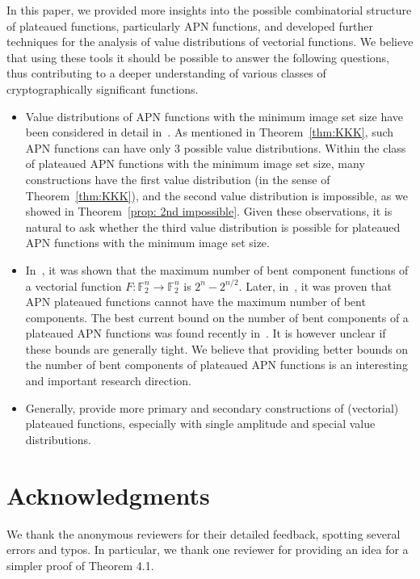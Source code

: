 \documentclass[11pt]{article}
\newcommand{\F}{\mathbb F}
\theoremstyle{plain}
\theoremstyle{definition}
\numberwithin{theorem}{section}
\numberwithin{equation}{section}
\numberwithin{table}{section}
\numberwithin{figure}{section}
\begin{document}
{In this paper, we provided more insights into the possible combinatorial structure of plateaued functions, particularly APN functions, and developed further techniques for the analysis of value distributions of vectorial functions. We believe that using these tools it should be possible to answer the following questions, thus contributing to a deeper understanding of various classes of cryptographically significant functions. 
\begin{itemize}
    \item[1.] Value distributions of APN functions with the minimum image set size have been considered in detail in~\cite{Koelsch2023}. As mentioned in Theorem~\ref{thm:KKK}, such APN functions can have only 3 possible value distributions. Within the class of plateaued APN functions with the minimum image set size, many constructions have the first value distribution (in the sense of Theorem~\ref{thm:KKK}), and the second value distribution is impossible, as we showed in Theorem~\ref{prop: 2nd impossible}. Given these observations, it is natural to ask whether the third value distribution is possible for plateaued APN functions with the minimum image set size.
    \item[2.] In~\cite{PottPasEt}, it was shown that the maximum number of bent component functions of a vectorial function $F \colon \F_2^n \to \F_2^n$ is $2^{n} - 2^{n/2}$. Later, in~\cite{Mesnager2019}, it was proven that APN plateaued functions cannot have the maximum number of bent components. The best current bound on the number of bent components of a plateaued APN functions was found recently in~\cite{Koelsch2025}. It is however unclear if these bounds are generally tight.  We believe that providing better bounds on the number of bent components of plateaued APN functions is an interesting and important research direction.
    \item[3.] Generally, provide more primary and secondary constructions of (vectorial) plateaued functions, especially with single amplitude and special value distributions.
\end{itemize}
  
\section*{Acknowledgments} We thank the anonymous reviewers for their detailed feedback, spotting several errors and typos. In particular, we thank one reviewer for providing an idea for a simpler proof of Theorem 4.1.

}
\end{document}
